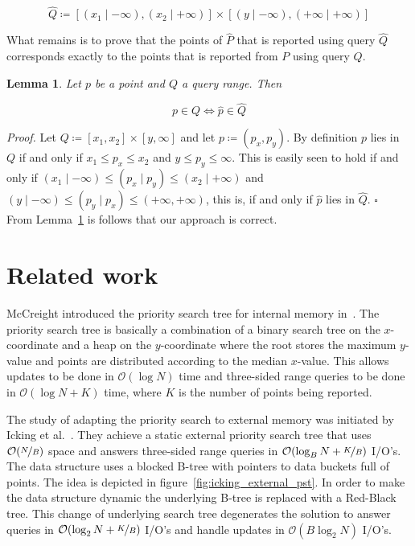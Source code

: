 \documentclass[twoside,11pt,openright]{report}
\newtheorem{lemma}{Lemma}
\begin{document}
$$ \hat{Q} \coloneqq [(x_1 \mid -\infty), (x_2 \mid +\infty)] \times [(y \mid -\infty),(+\infty \mid +\infty)] $$

What remains is to prove that the points of $\hat{P}$ that is reported using query $\hat{Q}$ corresponds exactly to the points that is reported from $P$ using query $Q$.

\begin{lemma}
\label{lma:composite_universe_query}
Let $p$ be a point and $Q$ a query range. Then

$$ p \in Q \Leftrightarrow \hat{p} \in \hat{Q} $$
\end{lemma}

\textit{Proof.} Let $Q \coloneqq [x_1, x_2] \times [y, \infty]$ and let $p \coloneqq (p_x,p_y)$. By definition $p$ lies in $Q$ if and only if $x_1 \leq p_x \leq x_2$ and $y \leq p_y \leq \infty$. This is easily seen to hold if and only if $(x_1 \mid -\infty) \leq (p_x \mid p_y) \leq (x_2 \mid +\infty)$ and $(y \mid -\infty) \leq (p_y \mid p_x) \leq (+\infty, +\infty)$, this is, if and only if $\hat{p}$ lies in $\hat{Q}$. $\square$ \\

From Lemma~\ref{lma:composite_universe_query} is follows that our approach is correct.

\chapter{Related work}
McCreight introduced the priority search tree for internal memory in~\cite{DBLP:journals/siamcomp/McCreight85}. The priority search tree is basically a combination of a binary search tree on the $x$-coordinate and a heap on the $y$-coordinate where the root stores the maximum $y$-value and points are distributed according to the median $x$-value. This allows updates to be done in $\mathcal{O}(\log N)$ time and three-sided range queries to be done in $\mathcal{O}(\log N + K)$ time, where $K$ is the number of points being reported.

The study of adapting the priority search to external memory was initiated by Icking et al.~\cite{Icking1988}. They achieve a static external priority search tree that uses $\mathcal{O}(\nicefrac{N}{B})$ space and answers three-sided range queries in $\mathcal{O}(\log_B N + \nicefrac{K}{B})$ I/O's. The data structure uses a blocked B-tree with pointers to data buckets full of points. The idea is depicted in figure~\ref{fig:icking_external_pst}. In order to make the data structure dynamic the underlying B-tree is replaced with a Red-Black tree. This change of underlying search tree degenerates the solution to answer queries in $\mathcal{O}(\log_2 N + \nicefrac{K}{B})$ I/O's and handle updates in $\mathcal{O}(B \log_2 N)$ I/O's.
\end{document}
